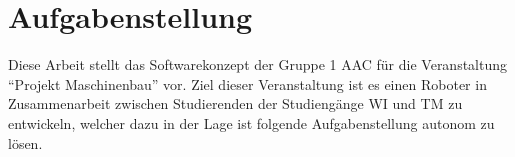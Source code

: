 \section{Aufgabenstellung}\label{sec:task}

Diese Arbeit stellt das Softwarekonzept der Gruppe 1 \ac{AAC} für die Veranstaltung \enquote{Projekt Maschinenbau} vor.
Ziel dieser Veranstaltung ist es einen Roboter in Zusammenarbeit zwischen Studierenden der Studiengänge \ac{WI} und \ac{TM} zu entwickeln, welcher dazu in der Lage ist folgende Aufgabenstellung autonom zu lösen.
